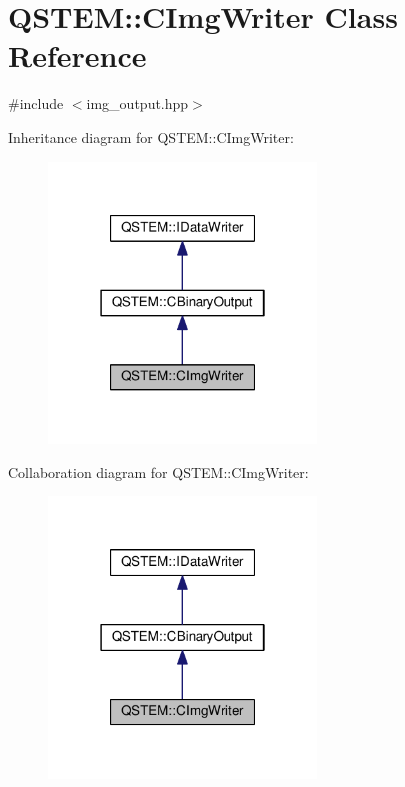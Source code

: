 \hypertarget{class_q_s_t_e_m_1_1_c_img_writer}{\section{Q\-S\-T\-E\-M\-:\-:C\-Img\-Writer Class Reference}
\label{class_q_s_t_e_m_1_1_c_img_writer}
}


{\ttfamily \#include $<$img\-\_\-output.\-hpp$>$}



Inheritance diagram for Q\-S\-T\-E\-M\-:\-:C\-Img\-Writer\-:
\nopagebreak
\begin{figure}[H]
\begin{center}
\leavevmode
\includegraphics[width=202pt]{class_q_s_t_e_m_1_1_c_img_writer__inherit__graph}
\end{center}
\end{figure}


Collaboration diagram for Q\-S\-T\-E\-M\-:\-:C\-Img\-Writer\-:
\nopagebreak
\begin{figure}[H]
\begin{center}
\leavevmode
\includegraphics[width=202pt]{class_q_s_t_e_m_1_1_c_img_writer__coll__graph}
\end{center}
\end{figure}
